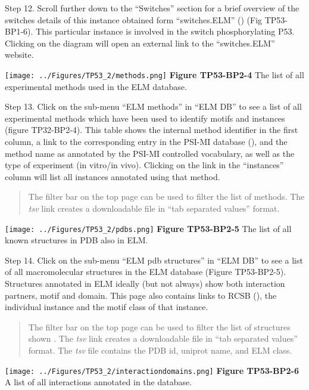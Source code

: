 Step 12. Scroll further down to the ``Switches'' section for a brief
overview of the switches details of this instance obtained form
``switches.ELM'' (\cite{23550212}) (Fig TP53-BP1-6). This particular
instance is involved in the switch phosphorylating P53. Clicking on the
diagram will open an external link to the ``switches.ELM'' website.

\texttt{[image: ../Figures/TP53\_2/methods.png]} \textbf{Figure
TP53-BP2-4} The list of all experimental methods used in the ELM
database.

Step 13. Click on the sub-menu ``ELM methods'' in ``ELM DB'' to see a
list of all experimental methods which have been used to identify motifs
and instances (figure TP32-BP2-4). This table shows the internal method
identifier in the first column, a link to the corresponding entry in the
PSI-MI database (\cite{17925023}), and the method name as annotated by
the PSI-MI controlled vocabulary, as well as the type of experiment (in
vitro/in vivo). Clicking on the link in the ``instances'' column will
list all instances annotated using that method.

\begin{quote}
The filter bar on the top page can be used to filter the list of
methods. The \emph{tsv} link creates a downloadable file in ``tab
separated values'' format.
\end{quote}

\texttt{[image: ../Figures/TP53\_2/pdbs.png]} \textbf{Figure TP53-BP2-5}
The list of all known structures in PDB also in ELM.

Step 14. Click on the sub-menu ``ELM pdb structures'' in ``ELM DB'' to
see a list of all macromolecular structures in the ELM database (Figure
TP53-BP2-5). Structures annotated in ELM ideally (but not always) show
both interaction partners, motif and domain. This page also contains
links to RCSB (\cite{12037327}), the individual instance and the motif
class of that instance.

\begin{quote}
The filter bar on the top page can be used to filter the list of
structures shown . The \emph{tsv} link creates a downloadable file in
``tab separated values'' format. The \emph{tsv} file contains the PDB
id, uniprot name, and ELM class.
\end{quote}

\texttt{[image: ../Figures/TP53\_2/interactiondomains.png]}
\textbf{Figure TP53-BP2-6} A list of all interactions annotated in the
database.

